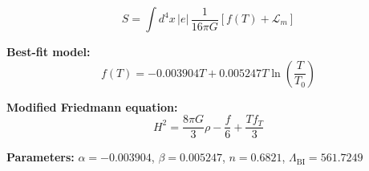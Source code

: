 
\begin{equation}
  S = \int d^4x \, |e| \, \frac{1}{16\pi G} \left[ f(T) + \mathcal{L}_m \right]
\end{equation}

\textbf{Best-fit model:}
\begin{equation}
  f(T) = -0.003904 T + 0.005247 T \ln\!\left(\frac{T}{T_0}\right)
\end{equation}

\textbf{Modified Friedmann equation:}
\begin{equation}
  H^2 = \frac{8\pi G}{3} \rho - \frac{f}{6} + \frac{T f_T}{3}
\end{equation}

\textbf{Parameters:}
$\alpha = -0.003904$, \quad
$\beta = 0.005247$, \quad
$n = 0.6821$, \quad
$\Lambda_{\text{BI}} = 561.7249$